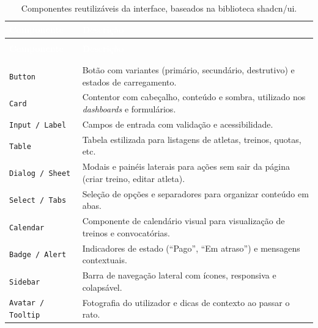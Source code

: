 \begin{center}
{\small
{}
\begin{xltabular}{\textwidth}{|>{\raggedright\arraybackslash}p{3.5cm}|>{\raggedright\arraybackslash}X|}
\hline
{}\textcolor{white}{\textbf{Componente}} & \textcolor{white}{\textbf{Descrição}} \\ \hline
\endfirsthead

 \\
\hline
{}\textcolor{white}{\textbf{Componente}} & \textcolor{white}{\textbf{Descrição}} \\ \hline
\endhead

\hline {} \\ \hline \endfoot

\hline
\caption{Componentes reutilizáveis da interface, baseados na biblioteca shadcn/ui.}
\label{tab:componentes-ui} \\
\endlastfoot

\texttt{Button}          & Botão com variantes (primário, secundário, destrutivo) e estados de carregamento. \\ \hline
\texttt{Card}            & Contentor com cabeçalho, conteúdo e sombra, utilizado nos \textit{dashboards} e formulários. \\ \hline
\texttt{Input / Label}   & Campos de entrada com validação e acessibilidade. \\ \hline
\texttt{Table}           & Tabela estilizada para listagens de atletas, treinos, quotas, etc. \\ \hline
\texttt{Dialog / Sheet}  & Modais e painéis laterais para ações sem sair da página (criar treino, editar atleta). \\ \hline
\texttt{Select / Tabs}   & Seleção de opções e separadores para organizar conteúdo em abas. \\ \hline
\texttt{Calendar}        & Componente de calendário visual para visualização de treinos e convocatórias. \\ \hline
\texttt{Badge / Alert}   & Indicadores de estado (``Pago'', ``Em atraso'') e mensagens contextuais. \\ \hline
\texttt{Sidebar}         & Barra de navegação lateral com ícones, responsiva e colapsável. \\ \hline
\texttt{Avatar / Tooltip} & Fotografia do utilizador e dicas de contexto ao passar o rato. \\ \hline
\end{xltabular}
}
\end{center}

